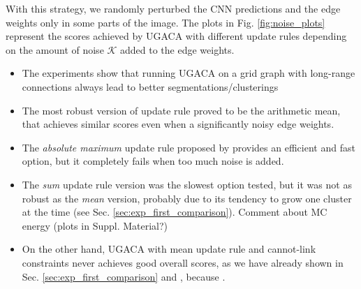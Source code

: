 With this strategy, we randomly perturbed the CNN predictions and the edge weights only in some parts of the image. The plots in Fig. \ref{fig:noise_plots} represent the scores achieved by UGACA with different update rules depending on the amount of noise $\mathcal{K}$ added to the edge weights. 
\begin{itemize}
\item The experiments show that running UGACA on a grid graph with long-range connections always lead to better segmentations/clusterings 
\item The most robust version of update rule proved to be the arithmetic mean, that achieves similar scores even when a significantly noisy edge weights.
\item The \emph{absolute maximum} update rule proposed by \cite{wolf2018mutex} provides an efficient and fast option, but it completely fails when too much noise is added.
\item The \emph{sum} update rule version was the slowest option tested, but it was not as robust as the \emph{mean} version, probably due to its tendency to grow one cluster at the time (see Sec. \ref{sec:exp_first_comparison}). Comment about MC energy (plots in Suppl. Material?)
\item On the other hand, UGACA with mean update rule and cannot-link constraints never achieves good overall scores, as we have already shown in Sec. \ref{sec:exp_first_comparison} and , because . 
\end{itemize}


